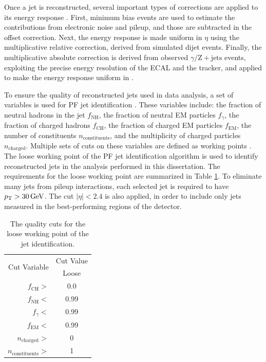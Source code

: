 \documentclass[12pt]{thesis}  %
\newcommand{\PZ}{\ensuremath{{\mathrm{Z}}}\xspace}%
\def\GZJ{\ensuremath{\gamma/\PZ+{\mathrm{jets}} }\xspace}
\begin{document}
Once a jet is reconstructed, several important types of corrections are applied to its energy response \cite{CMS-JEC}. First, minimum bias events are used to estimate the contributions from electronic noise and pileup, and those are subtracted in the offset correction. Next, the energy response is made uniform in $\eta$ using the multiplicative relative correction, derived from simulated dijet events. Finally, the multiplicative absolute correction is derived from observed \GZJ events, exploiting the precise energy resolution of the ECAL and the tracker, and applied to make the energy response uniform in \pt.

To ensure the quality of reconstructed jets used in data analysis, a set of variables is used for PF jet identification \cite{CMS-AN-2010-003}. These variables include: the fraction of neutral hadrons in the jet $f_{\text{NH}}$, the fraction of neutral EM particles $f_{\gamma}$, the fraction of charged hadrons $f_{\text{CH}}$, the fraction of charged EM particles $f_{\text{EM}}$, the number of constituents $n_{\text{constituents}}$, and the multiplicity of charged particles $n_{\text{charged}}$. Multiple sets of cuts on these variables are defined as working points \cite{PFJetID}. The loose working point of the PF jet identification algorithm is used to identify reconstructed jets in the analysis performed in this dissertation. The requirements for the loose working point are summarized in Table \ref{tab:jetWP}. To eliminate many jets from pileup interactions, each selected jet is required to have $p_{\mathrm{T}}>30\,\text{Ge\hspace{-.08em}V}$. The cut $|\eta|<2.4$ is also applied, in order to include only jets measured in the best-performing regions of the detector.

\begin{table}[htb]
  \begin{center}
    \begin{tabular}{|r|c|}
      \hline
      \multirow{2}{*}{Cut Variable} & Cut Value \\
      \cline{2-2}
                                    & Loose \\
      \hline
      $f_{\text{CH}}>$              & 0.0 \\
      $f_{\text{NH}}<$              & 0.99 \\
      $f_{\gamma}<$                 & 0.99 \\
      $f_{\text{EM}}<$              & 0.99 \\
      $n_{\text{charged}}>$         & 0 \\
      $n_{\text{constituents}}>$    & 1 \\
      \hline
    \end{tabular}
    \caption{The quality cuts for the loose working point of the jet identification. }
    \label{tab:jetWP}
  \end{center}
\end{table}
\end{document}
